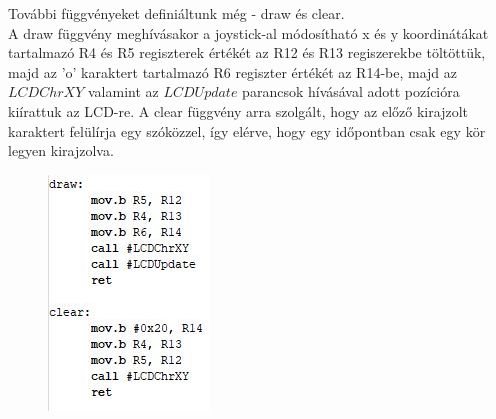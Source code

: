 \documentclass[10pt, conference, a4paper]{ITKproc}
\begin{document}
További függvényeket definiáltunk még - draw és clear.  \\
A draw függvény meghívásakor a joystick-al módosítható x és y koordinátákat tartalmazó R4 és R5 regiszterek értékét az R12 és R13 regiszerekbe töltöttük, majd az 'o' karaktert tartalmazó R6 regiszter értékét az R14-be, majd az $LCDChrXY$ valamint az $LCDUpdate$ parancsok hívásával adott pozícióra kiírattuk az LCD-re.
A clear függvény arra szolgált, hogy az előző kirajzolt karaktert felülírja egy szóközzel, így elérve, hogy egy időpontban csak egy kör legyen kirajzolva. 

\begin{figure}[h]
\includegraphics[scale=0.65]{3plus}
\centering
\end{figure}










%


\end{document}
